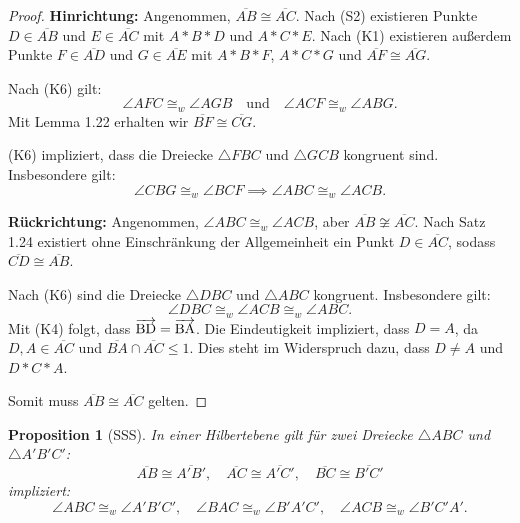 \documentclass[a4paper,12pt]{article}
\theoremstyle{break}
\newtheorem{proposition}[definition]{Proposition}
\begin{document}
\begin{proof}
\textbf{Hinrichtung:} Angenommen, \(\overline{AB} \cong \overline{AC}\). Nach (S2) existieren Punkte \(D \in \overline{AB}\) und \(E \in \overline{AC}\) mit \(A * B * D\) und \(A * C * E\). Nach (K1) existieren außerdem Punkte \(F \in \overline{AD}\) und \(G \in \overline{AE}\) mit \(A * B * F\), \(A * C * G\) und \(\overline{AF} \cong \overline{AG}\).

Nach (K6) gilt:
\[
\angle AFC \cong_w \angle AGB \quad \text{und} \quad \angle ACF \cong_w \angle ABG.
\]
Mit Lemma 1.22 erhalten wir \(\overline{BF} \cong \overline{CG}\). 

(K6) impliziert, dass die Dreiecke \(\triangle FBC\) und \(\triangle GCB\) kongruent sind. Insbesondere gilt:
\[
\angle CBG \cong_w \angle BCF \implies \angle ABC \cong_w \angle ACB.
\]

\textbf{Rückrichtung:} Angenommen, \(\angle ABC \cong_w \angle ACB\), aber \(\overline{AB} \not\cong \overline{AC}\). Nach Satz 1.24 existiert ohne Einschränkung der Allgemeinheit ein Punkt \(D \in \overline{AC}\), sodass \(\overline{CD} \cong \overline{AB}\).

Nach (K6) sind die Dreiecke \(\triangle DBC\) und \(\triangle ABC\) kongruent. Insbesondere gilt:
\[
\angle DBC \cong_w \angle ACB \cong_w \angle ABC.
\]
Mit (K4) folgt, dass \(\overrightarrow{\rm BD} = \overrightarrow{\rm BA}\). Die Eindeutigkeit impliziert, dass \(D = A\), da \(D, A \in \overline{AC}\) und \(\overline{BA} \cap \overline{AC} \leq 1\). Dies steht im Widerspruch dazu, dass \(D \neq A\) und \(D * C * A\).

Somit muss \(\overline{AB} \cong \overline{AC}\) gelten.
\end{proof}

\begin{proposition}[SSS]\label{prop:SSS}
In einer Hilbertebene gilt für zwei Dreiecke \(\triangle ABC\) und \(\triangle A'B'C'\):
\[
\overline{AB} \cong \overline{A'B'}, \quad \overline{AC} \cong \overline{A'C'}, \quad \overline{BC} \cong \overline{B'C'}
\]
impliziert:
\[
\angle ABC \cong_w \angle A'B'C', \quad \angle BAC \cong_w \angle B'A'C', \quad \angle ACB \cong_w \angle B'C'A'.
\]
\end{proposition}
\end{document}
